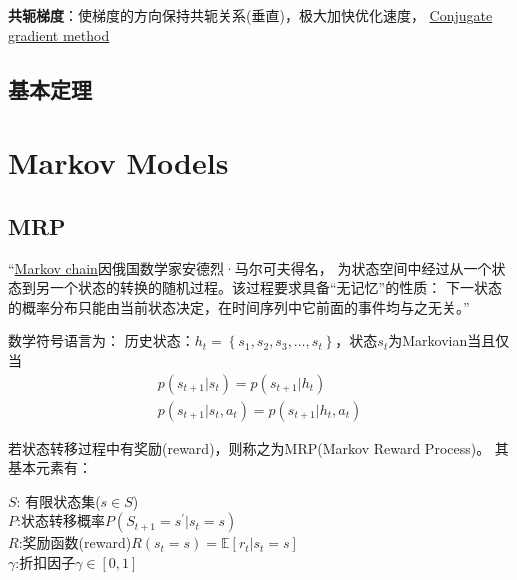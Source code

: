 \documentclass[UTF8]{ctexart}
\begin{document}
\textbf{共轭梯度}：使梯度的方向保持共轭关系(垂直)，极大加快优化速度，
\href{https://en.wikipedia.org/wiki/Conjugate_gradient_method}{Conjugate gradient method}


\subsection{基本定理}

\section{Markov Models}
\subsection{MRP}
“\href{https://en.wikipedia.org/wiki/Markov_chain}{Markov chain}因俄国数学家安德烈·马尔可夫得名，
为状态空间中经过从一个状态到另一个状态的转换的随机过程。该过程要求具备“无记忆”的性质：
下一状态的概率分布只能由当前状态决定，在时间序列中它前面的事件均与之无关。”

数学符号语言为：
历史状态：$h_{t}=\left\{s_{1}, s_{2}, s_{3}, \ldots, s_{t}\right\}$，状态$s_t$为Markovian当且仅当
\[ \begin{array}{c}
    p\left(s_{t+1} | s_{t}\right)=p\left(s_{t+1} | h_{t}\right) \\
    p\left(s_{t+1} | s_{t}, a_{t}\right)=p\left(s_{t+1} | h_{t}, a_{t}\right)
    \end{array}
\]


若状态转移过程中有奖励(reward)，则称之为MRP(Markov Reward Process)。
其基本元素有：
\begin{adjustwidth}{1.3cm}{0cm}
    $S$: 有限状态集($s \in S$)\\
    $P$:状态转移概率$P\left(S_{t+1}=s^{\prime} | s_{t}=s\right)$\\
    $R$:奖励函数(reward)$R\left(s_{t}=s\right)=\mathbb{E}\left[r_{t} | s_{t}=s\right]$\\
    $\gamma$:折扣因子$\gamma \in[0,1]$
\end{adjustwidth}
\end{document}
